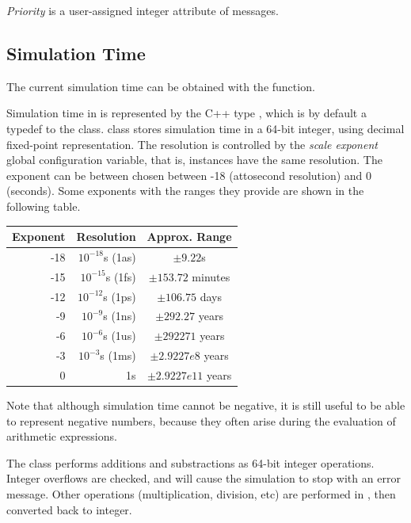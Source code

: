 \textit{Priority} is a user-assigned integer
attribute of messages.



\subsection{Simulation Time}
\label{sec:simple-modules:simulation-time}

The current simulation time can be obtained with the  function.

Simulation time in {\opp} is represented by the C++ type ,
which is by default a typedef to the  class.
 class stores simulation time in a 64-bit integer,
using decimal fixed-point representation. The resolution is controlled
by the \textit{scale exponent} global configuration variable, that is,
 instances have the same resolution. The exponent can be
between chosen between -18 (attosecond resolution) and 0 (seconds).
Some exponents with the ranges they provide are shown in the following table.

\begin{center}
  \begin{tabular}{ | r | r | c | }
    \hline
    Exponent & Resolution & Approx. Range \\ \hline
     -18 & $10^{-18}$s (1as) & $\pm 9.22$s \\
     -15 & $10^{-15}$s (1fs) & $\pm 153.72$ minutes \\
     -12 & $10^{-12}$s (1ps) & $\pm 106.75$ days \\
     -9  & $10^{-9}$s (1ns)  & $\pm 292.27$ years \\
     -6  & $10^{-6}$s (1us)  & $\pm 292271$ years \\
     -3  & $10^{-3}$s (1ms)  & $\pm 2.9227e8$ years \\
     0   & 1s                & $\pm 2.9227e11$ years \\
    \hline
  \end{tabular}
\end{center}

Note that although simulation time cannot be negative, it is still useful to
be able to represent negative numbers, because they often arise
during the evaluation of arithmetic expressions.

The  class performs additions and substractions as 64-bit integer
operations. Integer overflows are checked, and will cause the simulation to
stop with an error message. Other operations (multiplication, division, etc)
are performed in , then converted back to integer.

